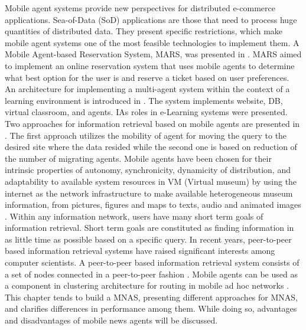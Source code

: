 \documentclass[12pt,a4paper,final,twoside,onecolumn,titlepage]{book}
\begin{document}
Mobile agent systems provide new perspectives for distributed e-commerce applications. Sea-of-Data (SoD) applications are those that need to process huge quantities of distributed data. They present specific restrictions, which make mobile agent systems one of the most feasible technologies to implement them. A Mobile Agent-based Reservation System, MARS, was presented in \cite{MNAS09}. MARS aimed to implement an online reservation system that uses mobile agents to determine what best option for the user is and reserve a ticket based on user preferences. An architecture for implementing a multi-agent system within the context of a learning environment is introduced in \cite{MNAS05}. The system implements website, \gls{DB}, virtual classroom, and agents. \gls{IA}s roles in e-Learning systems were presented. Two approaches for information retrieval based on mobile agents are presented in \cite{MNAS03}. The first approach utilizes the mobility of agent for moving the query to the desired site where the data resided while the second one is based on reduction of the number of migrating agents. Mobile agents have been chosen for their intrinsic properties of autonomy, synchronicity, dynamicity of distribution, and adaptability to available system resources in VM (Virtual museum) by using the internet as the network infrastructure to make available heterogeneous museum information, from pictures, figures and maps to texts, audio and animated images \cite{MNAS06}. Within any information network, users have many short term goals of information retrieval. Short term goals are constituted as finding information in as little time as possible based on a specific query. In recent years, peer-to-peer based information retrieval systems have raised significant interests among computer scientists. A peer-to-peer based information retrieval system consists of a set of nodes connected in a peer-to-peer fashion \cite{MNAS07, MNAS08}. Mobile agents can be used as a component in clustering architecture for routing in mobile ad hoc networks \cite{MNAS10}. This chapter tends to build a \gls{MNAS}, presenting different approaches for \gls{MNAS}, and clarifies differences in performance among them. While doing so, advantages and disadvantages of mobile news agents will be discussed.
\end{document}
